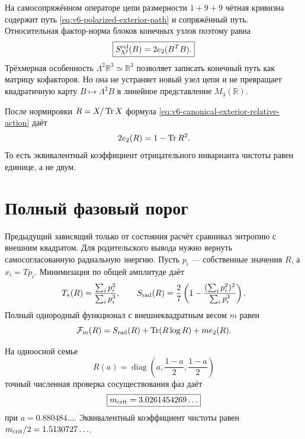 На самосопряжённом операторе цепи размерности $1+9+9$ чётная кривизна
содержит путь \eqref{eq:v6-polarized-exterior-path} и сопряжённый путь.
Относительная фактор-норма блоков конечных узлов поэтому равна
\begin{equation}
 \boxed{
 S_{\Lambda^2}^{\rm rel}(B)
 =2e_2(B^TB).}
 \label{eq:v6-canonical-exterior-relative-action}
\end{equation}
Трёхмерная особенность
$\Lambda^2\mathbb R^3\simeq\mathbb R^3$ позволяет записать конечный путь
как матрицу кофакторов. Но она не устраняет новый узел цепи и не превращает
квадратичную карту $B\mapsto\Lambda^2B$ в линейное представление
$M_3(\mathbb R)$.

После нормировки $R=X/\operatorname{Tr} X$ формула
\eqref{eq:v6-canonical-exterior-relative-action} даёт
\begin{equation}
 2e_2(R)=1-\operatorname{Tr} R^2.
 \label{eq:v6-canonical-exterior-state-weight}
\end{equation}
То есть эквивалентный коэффициент отрицательного инварианта чистоты равен
единице, а не двум.

\section{Полный фазовый порог}

Предыдущий зависящий только от состояния расчёт сравнивал энтропию с внешним квадратом. Для
родительского вывода нужно вернуть самосогласованную радиальную энергию.
Пусть $p_i$ --- собственные значения $R$, а $x_i=Tp_i$. Минимизация по
общей амплитуде даёт
\begin{equation}
 T_*(R)=\frac{\sum_i p_i^2}{\sum_i p_i^3},
 \qquad
 S_{\rm rad}(R)=\frac27\left(
 1-\frac{(\sum_i p_i^2)^2}{\sum_i p_i^3}
 \right).
 \label{eq:v6-self-consistent-radial-elimination}
\end{equation}
Полный однородный функционал с внешнеквадратным весом $m$ равен
\begin{equation}
 \mathcal F_m(R)
 =S_{\rm rad}(R)+\operatorname{Tr}(R\log R)+m e_2(R).
 \label{eq:v6-full-exterior-free-energy}
\end{equation}

На одноосной семье
\begin{equation}
 R(a)=\operatorname{diag}\left(a,\frac{1-a}{2},\frac{1-a}{2}\right)
\end{equation}
точный численная проверка сосуществования фаз даёт
\begin{equation}
 \boxed{m_{\rm crit}=3.0261454269\ldots}
 \label{eq:v6-full-exterior-threshold}
\end{equation}
при $a=0.880484\ldots$. Эквивалентный коэффициент чистоты равен
$m_{\rm crit}/2=1.5130727\ldots$.

